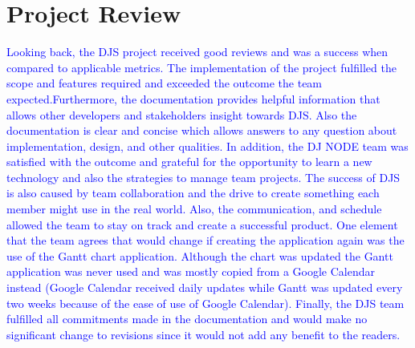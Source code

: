 \documentclass{article}
\begin{document}
\section{Project Review}
\textcolor{blue}{
\indent \indent Looking back, the DJS project received good reviews and was a success when compared to applicable metrics. The implementation of the project fulfilled the scope and features required and exceeded the outcome the team expected.Furthermore, the documentation provides helpful information that allows other developers and stakeholders insight towards DJS. Also the documentation is clear and concise which allows answers to any question about implementation, design, and other qualities. In addition, the DJ NODE team was satisfied with the outcome and grateful for the opportunity to learn a new technology and also the strategies to manage team projects. The success of DJS is also caused by team collaboration and the drive to create something each member might use in the real world. Also, the communication, and schedule allowed the team to stay on track and create a successful product. One element that the team agrees that would change if creating the application again was the use of the Gantt chart application. Although the chart was updated the Gantt application was never used and was mostly copied from a Google Calendar instead (Google Calendar received daily updates while Gantt was updated every two weeks because of the ease of use of Google Calendar). Finally, the DJS team fulfilled all commitments made in the documentation and would make no significant change to revisions since it would not add any benefit to the readers.}
\end{document}
